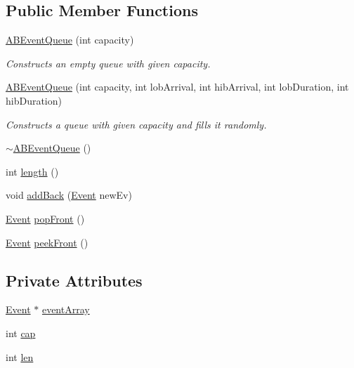 \subsection*{Public Member Functions}
\begin{DoxyCompactItemize}
\item 
\hyperlink{class_a_b_event_queue_a8e2c4bb3d9315eb6fe227250d0d67cd7}{A\+B\+Event\+Queue} (int capacity)
\begin{DoxyCompactList}\small\item\em Constructs an empty queue with given capacity. \end{DoxyCompactList}\item 
\hyperlink{class_a_b_event_queue_a260b9f55c3ee4d3eae601e03ceb168ea}{A\+B\+Event\+Queue} (int capacity, int lob\+Arrival, int hib\+Arrival, int lob\+Duration, int hib\+Duration)
\begin{DoxyCompactList}\small\item\em Constructs a queue with given capacity and fills it randomly. \end{DoxyCompactList}\item 
\hyperlink{class_a_b_event_queue_a1294c9f60862ba7c384aee7291f82241}{$\sim$\+A\+B\+Event\+Queue} ()
\item 
int \hyperlink{class_a_b_event_queue_a59443fdc10016ddc1a6949f10c49c2ed}{length} ()
\item 
void \hyperlink{class_a_b_event_queue_adc34af0cd37c4ba62988eb2ee892357e}{add\+Back} (\hyperlink{struct_event}{Event} new\+Ev)
\item 
\hyperlink{struct_event}{Event} \hyperlink{class_a_b_event_queue_a0c1f23891bc06650703034f1854989d1}{pop\+Front} ()
\item 
\hyperlink{struct_event}{Event} \hyperlink{class_a_b_event_queue_aad5e909e29cb0eb71fbb5bf330e699eb}{peek\+Front} ()
\end{DoxyCompactItemize}
\subsection*{Private Attributes}
\begin{DoxyCompactItemize}
\item 
\hyperlink{struct_event}{Event} $\ast$ \hyperlink{class_a_b_event_queue_acb0bc62d6a21b4633ba50ae83fd4d79e}{event\+Array}
\item 
int \hyperlink{class_a_b_event_queue_a3f8d4bf9c3dad9b88a9f99220b567ed6}{cap}
\item 
int \hyperlink{class_a_b_event_queue_a26f1044edfb22cd3438b6da3839f6087}{len}
\end{DoxyCompactItemize}


